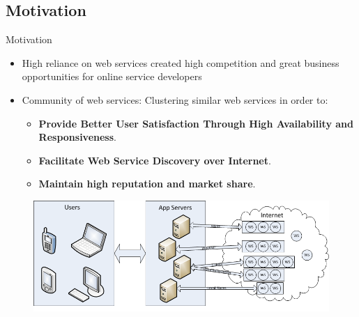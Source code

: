 \documentclass{beamer}
\begin{document}
\subsection{Motivation}
    \begin{frame}{Motivation}
    \begin{itemize}
        \item High reliance on web services created high competition and great business opportunities for online service developers
        \item Community of web services: Clustering similar web services in order to:
        \begin{itemize}
            \item \textbf{Provide Better User Satisfaction Through High Availability and Responsiveness}.
            \item \textbf{Facilitate Web Service Discovery over Internet}.
            \item \textbf{Maintain high reputation and market share}.
        \end{itemize}
    \end{itemize}
    \begin{figure}[htbp]
        \centering
        \includegraphics[width=1.0 \columnwidth]{figures/wsinternet.png}
    \end{figure}
    \end{frame}


\end{document}
